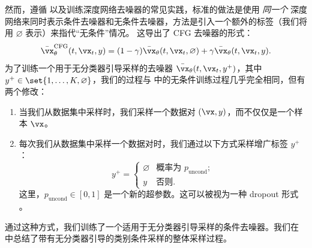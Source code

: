 \documentclass[../../book-main_zh.tex]{subfiles}
\begin{document}
然而，遵循 \textcite{Ho2022-ry} 以及训练深度网络去噪器的常见实践，标准的做法是使用 \textit{同一个} 深度网络来同时表示条件去噪器和无条件去噪器，方法是引入一个额外的标签（我们将用 $\varnothing$ 表示）来指代“无条件”情况。
这导出了 CFG 去噪器的形式：
\begin{equation}\label{eq:conditional-denoising-mmse-denoiser-paired-data-approx-cfg}
    \bar{\vx}_{\theta}^{\mathrm{CFG}}(t, \vx_t, y)
    =
    (1 - \gamma) \bar{\vx}_{\theta}(t, \vx_t, \varnothing)
    +
    \gamma \bar{\vx}_{\theta}(t, \vx_t, y).
\end{equation}
为了训练一个用于无分类器引导采样的去噪器 $\bar{\vx}_{\theta}(t, \vx_t, y^+)$，其中 $y^+ \in
\set{1, \dots, K, \varnothing}$，我们的过程与  中的无条件训练过程几乎完全相同，但有两个修改：
\begin{enumerate}
    \item 当我们从数据集中采样时，我们采样一个数据对 $(\vx,
        y)$，而不仅仅是一个样本 $\vx$。
    \item 每次我们从数据集中采样一个数据对时，我们通过以下方式采样增广标签 $y^+$：
        \begin{equation}
            y^+ =
            \begin{cases}
                \varnothing & \text{概率为 } p_{\mathrm{uncond}}; \\
                y & \text{否则}.
            \end{cases}
        \end{equation}
        这里，$p_{\mathrm{uncond}} \in [0, 1]$ 是一个新的超参数。这可以被视为一种 dropout 形式 \cite{srivastava2014dropout}。
\end{enumerate}
通过这种方式，我们训练了一个适用于无分类器引导采样的条件去噪器。我们在  中总结了带有无分类器引导的类别条件采样的整体采样过程。
\end{document}
